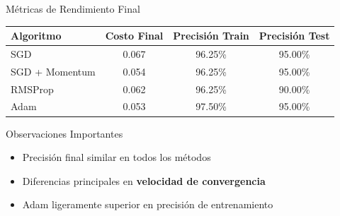 \documentclass[10pt]{beamer}
\begin{document}
\begin{frame}{Métricas de Rendimiento Final}
\begin{table}[ht]
\centering
\small
\begin{tabular}{lccc}
\toprule
\textbf{Algoritmo} & \textbf{Costo Final} & \textbf{Precisión Train} & \textbf{Precisión Test} \\
\midrule
SGD & 0.067 & 96.25\% & 95.00\% \\
SGD + Momentum & 0.054 & 96.25\% & 95.00\% \\
RMSProp & 0.062 & 96.25\% & 90.00\% \\
Adam & 0.053 & 97.50\% & 95.00\% \\
\bottomrule
\end{tabular}
\end{table}

\begin{block}{Observaciones Importantes}
\begin{itemize}
\item Precisión final similar en todos los métodos
\item Diferencias principales en \textbf{velocidad de convergencia}
\item Adam ligeramente superior en precisión de entrenamiento
\end{itemize}
\end{block}
\end{frame}
\end{document}
